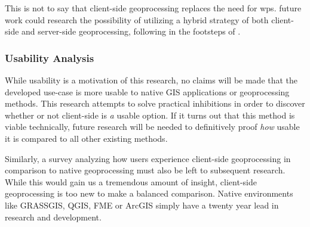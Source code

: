 This is not to say that client-side geoprocessing replaces the need for \ac{wps}. 
future work could research the possibility of utilizing a hybrid strategy of both client-side and server-side geoprocessing, following in the footsteps of \cite{panidi_hybrid_2015}. 



\subsubsection*{ Usability Analysis } %

While usability is a motivation of this research, no claims will be made that the developed use-case is more usable to native GIS applications or geoprocessing methods. This research attempts to solve practical inhibitions in order to discover whether or not client-side is \emph{a} usable option. If it turns out that this method is viable technically, future research will be needed to definitively proof \emph{how} usable it is compared to all other existing methods.  


Similarly, a survey analyzing how users experience client-side geoprocessing in comparison to native geoprocessing must also be left to subsequent research. While this would gain us a tremendous amount of insight, client-side geoprocessing is too new to make a balanced comparison. Native environments like GRASSGIS, QGIS, FME or ArcGIS simply have a twenty year lead in research and development. 









